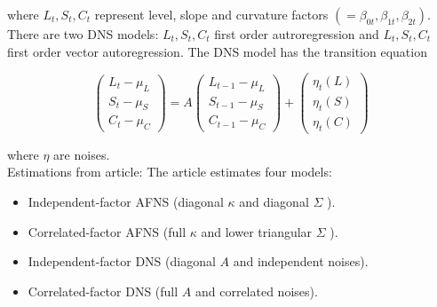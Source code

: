 where $L_{t}, S_{t}, C_{t}$ represent level, slope and curvature factors $\left(=\beta_{0 t}, \beta_{1 t}, \beta_{2 t}\right)$. There are two DNS models: $L_{t}, S_{t}, C_{t}$ first order autroregression and $L_{t}, S_{t}, C_{t}$ first order vector autoregression. The DNS model has the transition equation

$$
\left(\begin{array}{c}
L_{t}-\mu_{L} \\
S_{t}-\mu_{S} \\
C_{t}-\mu_{C}
\end{array}\right)=A\left(\begin{array}{c}
L_{t-1}-\mu_{L} \\
S_{t-1}-\mu_{S} \\
C_{t-1}-\mu_{C}
\end{array}\right)+\left(\begin{array}{c}
\eta_{t}(L) \\
\eta_{t}(S) \\
\eta_{t}(C)
\end{array}\right)
$$

where $\eta$ are noises.\\
Estimations from article: The article estimates four models:

\begin{itemize}
  \item Independent-factor AFNS (diagonal $\kappa$ and diagonal $\Sigma$ ).
  \item Correlated-factor AFNS (full $\kappa$ and lower triangular $\Sigma$ ).
  \item Independent-factor DNS (diagonal $A$ and independent noises).
  \item Correlated-factor DNS (full $A$ and correlated noises).
\end{itemize}

